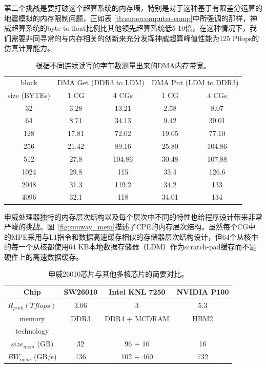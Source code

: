 \documentclass[degree=doctor]{thuthesis}
\begin{document}
第二个挑战是要打破这个超算系统的内存墙，特别是对于这种基于有限差分运算的地震模拟的内存限制问题，正如表 \ref {tb:supercomputer-comp}中所强调的那样，神威超算系统的byte-to-float比例比其他领先超算系统低5-10倍，在这种情况下，我们需要非同寻常的与内存相关的创新来充分发挥神威超算峰值性能为125 Pflops的仿真计算能力。

\begin{table}[ht]
\small
\caption{根据不同连续读写的字节数测量出来的DMA内存带宽。}
\label{tb:sw-bw}
\centering
\begin{tabular}{ccccc}
\hline\hline
  block & \multicolumn{2}{c}{DMA Get (DDR3 to LDM)} & \multicolumn{2}{c}{DMA Put (LDM to DDR3)} \\
  size (BYTEs) & 1 CG & 4 CGs & 1 CG & 4 CGs \\\hline
  32 & 3.28 & 13.21 & 2.58 & 8.07 \\
  64 & 8.71 & 34.13 & 9.42 & 39.01 \\
  128 & 17.81 & 72.02 & 19.05 & 77.10 \\
  256 & 21.42 & 89.16 & 25.80 & 104.86 \\
  512 & 27.8 & 104.86 & 30.48 & 107.88 \\
  1024 & 29.8 & 115 & 33.4 & 126.6 \\
  2048 & 31.3 & 119.2 & 34.2 & 133 \\
  4096 & 32.1 & 118 & 34.01 & 134 \\
  \hline
\end{tabular}
\end{table}



申威处理器独特的内存层次结构以及每个层次中不同的特性也给程序设计带来非常严峻的挑战。图~\ref {fig:sunway_mem}描述了CPE的内存层次结构。虽然每个CG中的MPE采用与L1指令和数据高速缓存相似的存储器层次结构设计，但64个从核中的每一个从核都使用64 KB本地数据存储器（LDM）作为scratch-pad缓存而不是硬件上的高速数据缓存。




\begin{table}[ht]
\caption{申威26010芯片与其他多核芯片的简要对比。}
\label{tb:proc-comp}
\centering
\begin{tabular*}{0.8\columnwidth}{cccc}
\hline\hline
  Chip & SW26010 & Intel KNL 7250 & NVIDIA P100 \\\hline
    $R_{peak} (Tflops)$ & 3.06 & 3 & 5.3 \\\hline
    memory   & DDR3 & DDR4 + MCDRAM & HBM2 \\
    technology \\\hline
    $size_{mem}$ (GB) & 32 & 96 + 16 & 16 \\\hline
    $BW_{mem}$ (GB/s)  & 136 & 102 + 460 & 732 \\\hline
\hline
\end{tabular*}
\end{table}
\end{document}
